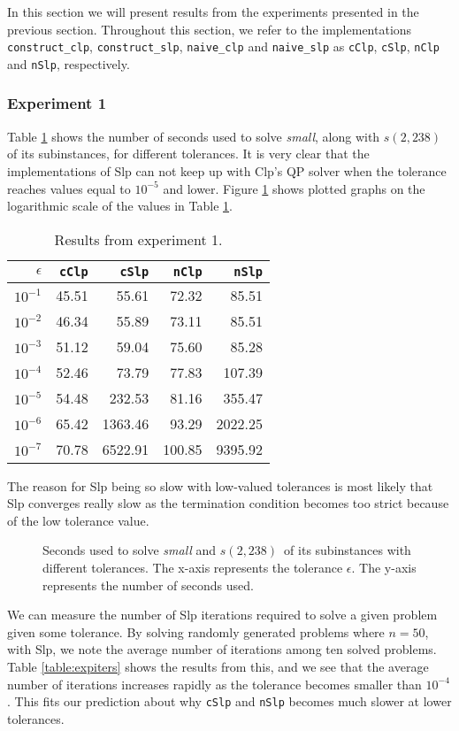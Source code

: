 In this section we will present results from the experiments presented in the
previous section. Throughout this section, we refer to the implementations
\texttt{construct\_clp}, \texttt{construct\_slp}, \texttt{naive\_clp} and
\texttt{naive\_slp} as \texttt{cClp}, \texttt{cSlp}, \texttt{nClp} and
\texttt{nSlp}, respectively.

\subsubsection{Experiment 1}
Table \ref{table:expone} shows the number of seconds
used to solve \textit{small}, along with $s(2, 238)$ of its subinstances, for
different tolerances.
It is very clear that the implementations of Slp can not
keep up with Clp's QP solver when the tolerance reaches values equal to
$10^{-5}$ and lower.
Figure \ref{fig:smalltolerance} shows plotted graphs on the logarithmic scale
of the values in Table \ref{table:expone}.

\begin{table}[ht!]
\centering
\caption{Results from experiment 1.}
\begin{tabular}{rrrrr}
$\epsilon$ & \texttt{cClp} & \texttt{cSlp} & \texttt{nClp} & \texttt{nSlp} \\ \hline
$10^{-1}$ & 45.51 & 55.61 & 72.32 & 85.51 \\
$10^{-2}$ & 46.34 & 55.89 & 73.11 & 85.51 \\
$10^{-3}$ & 51.12 & 59.04 & 75.60 & 85.28 \\
$10^{-4}$ & 52.46 & 73.79 & 77.83 & 107.39 \\
$10^{-5}$ & 54.48 & 232.53 & 81.16 & 355.47 \\
$10^{-6}$ & 65.42 & 1363.46 & 93.29 & 2022.25 \\
$10^{-7}$ & 70.78 & 6522.91 & 100.85 & 9395.92
\end{tabular}
\label{table:expone}
\end{table}

The reason for Slp being so slow with low-valued tolerances is most likely that
Slp converges really slow as the termination condition becomes too strict
because of the low tolerance value.
\begin{figure}[ht!]
    \centering
    
    \caption{Seconds used to solve \textit{small} and $s(2, 238)$ of its
             subinstances with different tolerances.
             The x-axis represents the tolerance $\epsilon$.
             The y-axis represents the number of seconds used.}
    \label{fig:smalltolerance}
\end{figure}
We can measure the number of Slp iterations required to solve a given problem
given some tolerance. By solving randomly generated problems where $n = 50$,
with Slp, we note the average number of iterations among ten solved
problems. Table \ref{table:expiters} shows the results from this, and we see
that the average number of iterations increases rapidly as the tolerance
becomes smaller than $10^{-4}$. This fits our prediction about why
\texttt{cSlp} and \texttt{nSlp} becomes much slower at lower tolerances.

